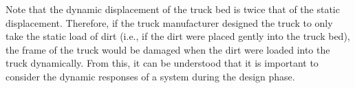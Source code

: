 \documentclass[12pt,letter]{article}
\begin{document}
\begin{example}
Note that the dynamic displacement of the truck bed is twice that of the static displacement. Therefore, if the truck manufacturer designed the truck to only take the static load of dirt (i.e., if the dirt were placed gently into the truck bed), the frame of the truck would be damaged when the dirt were loaded into the truck dynamically. From this, it can be understood that it is important to consider the dynamic responses of a system during the design phase.


\end{example}
\end{document}
